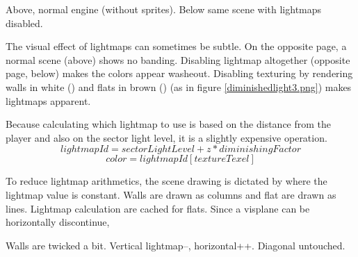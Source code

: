 
Above, normal engine (without sprites). Below same scene with lightmaps disabled.
\vspace{2mm}



\par
The visual effect of lightmaps can sometimes be subtle. On the opposite page, a normal scene (above) shows no banding. Disabling lightmap altogether (opposite page, below) makes the colors appear washeout. Disabling texturing by rendering walls in white () and flats in brown () (as in figure \ref{diminishedlight3.png}) makes lightmaps apparent.\\
\par
Because calculating which lightmap to use is based on the distance from the player and also on the sector light level, it is a slightly expensive operation.\\
$$ lightmapId = sectorLightLevel + z * diminishingFactor $$
$$   color = lightmapId[textureTexel] $$
\par
 To reduce lightmap arithmetics, the scene drawing is dictated by where the lightmap value is constant. Walls are drawn as columns and flat are drawn as lines. Lightmap calculation are cached for flats. Since a visplane can be horizontally discontinue, \\
 \par
 Walls are twicked a bit. Vertical lightmap--, horizontal++. Diagonal untouched.\\
\pagebreak



\\
\par 
{}
\par
{}\\
\par
{}\\




